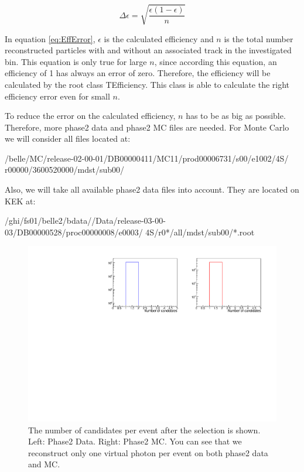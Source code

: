 \documentclass[a4paper,11pt,twosided,final,german,openbib,pdftex,listof=totoc,bibliography=totoc]{scrbook}
\begin{document}
\begin{equation}
\Delta \epsilon = \sqrt{\frac{\epsilon(1-\epsilon)}{n}}
\label{eq:EffError}
\end{equation}

In equation \ref{eq:EffError}, $\epsilon$ is the calculated efficiency and $n$ is the total number reconstructed particles with and without an associated track in the investigated bin. This equation is only true for large $n$, since according this equation, an efficiency of 1 has always an error of zero. Therefore, the efficiency will be calculated by the root class TEfficiency. This class is able to calculate the right efficiency error even for small $n$. \cite{TEfficiency}



To reduce the error on the calculated efficiency, $n$ has to be as big as possible. Therefore, more phase2 data and phase2 MC files are needed. For Monte Carlo we will consider all files located at: 
\newline

/belle/MC/release-02-00-01/DB00000411/MC11/prod00006731/s00/e1002/4S/
r00000/3600520000/mdst/sub00/
\newline

Also, we will take all available phase2 data files into account. They are located on KEK at:
\newline

/ghi/fs01/belle2/bdata//Data/release-03-00-03/DB00000528/proc00000008/e0003/ 4S/r0*/all/mdst/sub00/*.root
\newline


\begin{figure}[h!]
	\includegraphics[width=\textwidth]{Bilder/CCand.pdf}
	\caption[Total Number Of Events After The Selection]{The number of candidates per event after the selection is shown. Left: Phase2 Data. Right: Phase2 MC. You can see that we reconstruct only one virtual photon per event on both phase2 data and MC.}
	\label{fig:nCandAS}
\end{figure}
\end{document}
